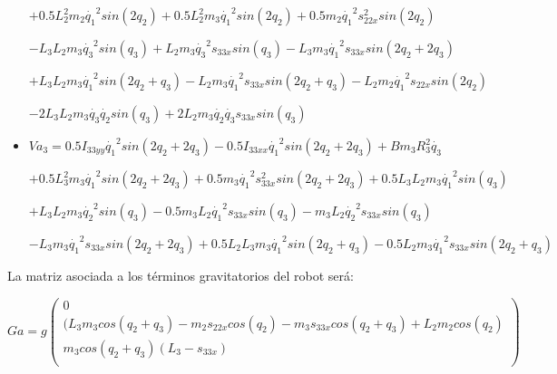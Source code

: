 \begin{itemize}
	$+0.5L_{2}^{2}m_{2} \dot{q_{1}}^{2}sin(2q_{2}) +0.5L_{2}^{2}m_{3} \dot{q_{1}}^{2}sin(2q_{2}) +0.5m_{2} \dot{q_{1}}^{2}s_{22x}^{2}sin(2q_{2}) $ \\ \vspace{0.1cm}
	
	$-L_{3}L_{2}m_{3} \dot{q_{3}}^{2}sin(q_{3}) +L_{2}m_{3}\dot{q_{3}}^{2}s_{33x}sin(q_{3}) -L_{3}m_{3}\dot{q_{1}}^{2}s_{33x}sin(2q_{2}+2q_{3}) $ \\ \vspace{0.1cm}
	
	$ +L_{3}L_{2}m_{3} \dot{q_{1}}^{2}sin(2q_{2}+q_{3}) -L_{2}m_{3}\dot{q_{1}}^{2}s_{33x}sin(2q_{2}+q_{3}) -L_{2}m_{2}\dot{q_{1}}^{2}s_{22x}sin(2q_{2}) $ \\ \vspace{0.1cm}
	
	$-2L_{3}L_{2}m_{3} \dot{q_{3}}\dot{q_{2}}sin(q_{3}) +2L_{2}m_{3} \dot{q_{2}}\dot{q_{3}}s_{33x}sin(q_{3}) $ \\ \vspace{0.2cm}
	
	
	
	\item $Va_{3}=0.5I_{33yy}\dot{q_{1}}^{2}sin(2q_{2}+2q_{3}) -0.5I_{33xx}\dot{q_{1}}^{2}sin(2q_{2}+2q_{3}) +Bm_{3}R_{3}^{2}\dot{q_{3}} $ \\ \vspace{0.1cm}
	
	$ +0.5L_{3}^{2}m_{3} \dot{q_{1}}^{2}sin(2q_{2}+2q_{3}) +0.5m_{3}\dot{q_{1}}^{2}s_{33x}^{2}sin(2q_{2}+2q_{3}) +0.5L_{3}L_{2}m_{3} \dot{q_{1}}^{2}sin(q_{3}) $ \\ \vspace{0.1cm}
	
	$+L_{3}L_{2}m_{3} \dot{q_{2}}^{2}sin(q_{3}) -0.5m_{3}L_{2}\dot{q_{1}}^{2}s_{33x}sin(q_{3}) -m_{3}L_{2}\dot{q_{2}}^{2}s_{33x}sin(q_{3}) $ \\ \vspace{0.1cm}
	
	$-L_{3}m_{3}\dot{q_{1}}^{2}s_{33x}sin(2q_{2}+2q_{3}) +0.5L_{2}L_{3}m_{3}\dot{q_{1}}^{2}sin(2q_{2}+q_{3}) -0.5L_{2}m_{3}\dot{q_{1}}^{2}s_{33x}sin(2q_{2}+q_{3})$ \\
	
\end{itemize}



La matriz asociada a los términos gravitatorios del robot será:

\[
Ga=g
\begin{pmatrix}
0\\

(L_{3}m_{3}cos(q_{2}+q_{3})-m_{2}s_{22x}cos(q_{2})-m_{3}s_{33x}cos(q_{2}+q_{3})+L_{2}m_{2}cos(q_{2})\\

m_{3}cos(q_{2}+q_{3})(L_{3}-s_{33x})\\
\end{pmatrix} \]





